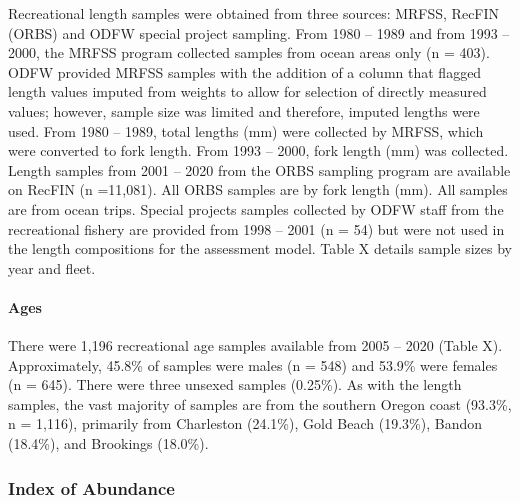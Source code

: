 \documentclass[11pt,
  english,
  a4paper,
]{article}
\begin{document}
Recreational length samples were obtained from three sources: MRFSS, RecFIN (ORBS) and ODFW special project sampling. From 1980 -- 1989 and from 1993 -- 2000, the MRFSS program collected samples from ocean areas only (n = 403). ODFW provided MRFSS samples with the addition of a column that flagged length values imputed from weights to allow for selection of directly measured values; however, sample size was limited and therefore, imputed lengths were used. From 1980 -- 1989, total lengths (mm) were collected by MRFSS, which were converted to fork length. From 1993 -- 2000, fork length (mm) was collected. Length samples from 2001 -- 2020 from the ORBS sampling program are available on RecFIN (n =11,081). All ORBS samples are by fork length (mm). All samples are from ocean trips. Special projects samples collected by ODFW staff from the recreational fishery are provided from 1998 -- 2001 (n = 54) but were not used in the length compositions for the assessment model. Table X details sample sizes by year and fleet.

\leavevmode\tagmcend\tagstructend\par


\hypertarget{ages-1}{%
\paragraph{Ages}\label{ages-1}}

\leavevmode\tagmcend\tagstructend


There were 1,196 recreational age samples available from 2005 -- 2020 (Table X). Approximately, 45.8\% of samples were males (n = 548) and 53.9\% were females (n = 645). There were three unsexed samples (0.25\%). As with the length samples, the vast majority of samples are from the southern Oregon coast (93.3\%, n = 1,116), primarily from Charleston (24.1\%), Gold Beach (19.3\%), Bandon (18.4\%), and Brookings (18.0\%).

\leavevmode\tagmcend\tagstructend\par


\hypertarget{index-of-abundance}{%
\subsubsection{Index of Abundance}\label{index-of-abundance}}
\end{document}
